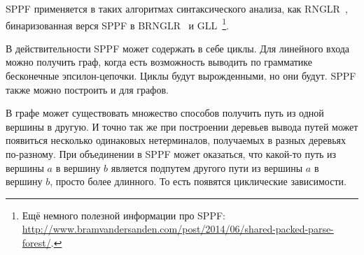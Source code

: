 SPPF применяется в таких алгоритмах синтаксического анализа, как RNGLR~\cite{Scott:2006:RNG:1146809.1146810}, бинаризованная верся SPPF в BRNGLR~\cite{Scott:2007:BCT:1289813.1289815} и GLL~\cite{Scott:2010:GP:1860132.1860320,10.1007/978-3-662-46663-6_5}\footnote{Ещё немного полезной информации про SPPF: \url{http://www.bramvandersanden.com/post/2014/06/shared-packed-parse-forest/}.}.

В действительности SPPF может содержать в себе циклы. Для линейного входа можно получить граф, когда есть возможность выводить по грамматике бесконечные эпсилон-цепочки. Циклы будут вырожденными, но они будут. SPPF также можно построить и для графов.

В графе может существовать множество способов получить путь из одной вершины в другую. И точно так же при построении деревьев вывода путей может появиться несколько одинаковых нетерминалов, получаемых в разных деревьях по-разному. При объединении в SPPF может оказаться, что какой-то путь из вершины $a$ в вершину $b$ является подпутем другого пути из вершины $a$ в вершину $b$, просто более длинного. То есть появятся циклические зависимости.





